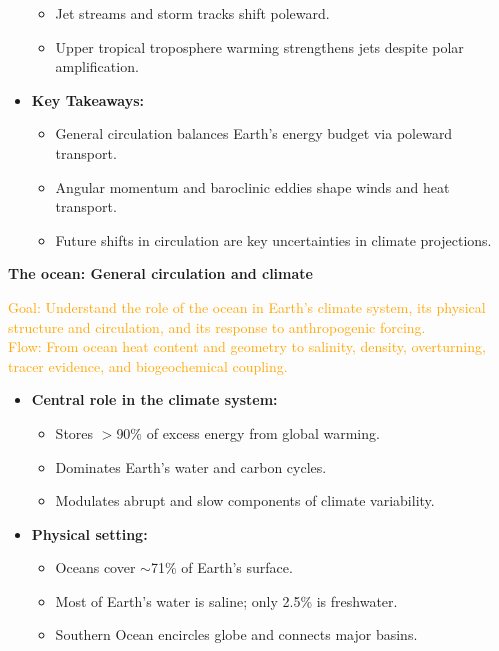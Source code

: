 \documentclass[fontsize=8pt, a4paper, landscape, fleqn]{scrartcl}
\renewcommand{\section}[1]{%
    \noindent\colorbox{sectioncolor}{%
        \parbox{\dimexpr\columnwidth-2\fboxsep}{\color{white}\textbf{#1}}}%
    \vspace{0.5mm}%
}
\begin{document}
\begin{multicols*}{3}[\raggedcolumns]
\begin{itemize}
\begin{itemize}
        \item Jet streams and storm tracks shift poleward.
        \item Upper tropical troposphere warming strengthens jets despite polar amplification.
    \end{itemize}
    \item \textbf{Key Takeaways:}
    \begin{itemize}
        \item General circulation balances Earth's energy budget via poleward transport.
        \item Angular momentum and baroclinic eddies shape winds and heat transport.
        \item Future shifts in circulation are key uncertainties in climate projections.
    \end{itemize}
\end{itemize}

\section{The ocean: General circulation and climate}
\noindent\textcolor{orange}{
Goal: Understand the role of the ocean in Earth's climate system, its physical structure and circulation, and its response to anthropogenic forcing.\\
Flow: From ocean heat content and geometry to salinity, density, overturning, tracer evidence, and biogeochemical coupling.
}

\begin{itemize}
    \item \textbf{Central role in the climate system:}
    \begin{itemize}
        \item Stores $>$90\% of excess energy from global warming.
        \item Dominates Earth's water and carbon cycles.
        \item Modulates abrupt and slow components of climate variability.
    \end{itemize}

    \item \textbf{Physical setting:}
    \begin{itemize}
        \item Oceans cover $\sim$71\% of Earth’s surface.
        \item Most of Earth's water is saline; only 2.5\% is freshwater.
        \item Southern Ocean encircles globe and connects major basins.
    \end{itemize}


\end{itemize}
\end{multicols*}
\end{document}
